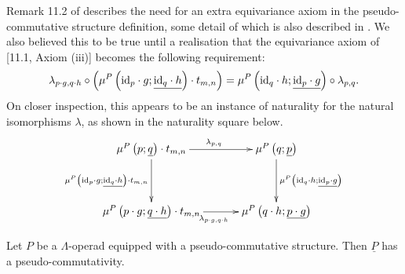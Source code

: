 \begin{remark}
Remark 11.2 of \cite{guillou_multiplicative} describes the need for an extra equivariance axiom in the pseudo-commutative structure definition, some detail of which is also described in \cite{guillou_symmetric}. We also believed this to be true until a realisation that the equivariance axiom of \cite{guillou_multiplicative}[11.1, Axiom (iii)] becomes the following requirement:
          \[
            \lambda_{p \cdot g, q \cdot h} \circ \left(\mu^P\left(\textrm{id}_p \cdot g; \underline{\textrm{id}_q \cdot h}\right) \cdot t_{m,n}\right) = \mu^P\left(\textrm{id}_q \cdot h; \underline{\textrm{id}_p \cdot g}\right) \circ \lambda_{p,q}.
          \]
On closer inspection, this appears to be an instance of naturality for the natural isomorphisms $\lambda$, as shown in the naturality square below.
          \[
            \xy
              (-20,10)*+{\mu^P\left(p;\underline{q}\right) \cdot t_{m,n}}="a";
              (20,10)*+{\mu^P\left(q;\underline{p}\right)}="b";
              (-20,-10)*+{\mu^P\left(p \cdot g; \underline{q \cdot h}\right) \cdot t_{m,n}}="c";
              (20,-10)*+{\mu^P\left(q \cdot h; \underline{p \cdot g}\right)}="d";
              {\ar^{\lambda_{p,q}} "a" ; "b"};
              {\ar^{\mu^P\left(\id_q \cdot h; \underline{\id_p \cdot g}\right)} "b" ; "d"};
              {\ar_{\mu^P\left(\id_p \cdot g; \underline{\id_q \cdot h}\right) \cdot t_{m,n}} "a" ; "c"};
              {\ar_{\lambda_{p \cdot g, q \cdot h}} "c" ; "d"};
            \endxy
          \]
\end{remark}

\begin{thm}\label{pscomm}
Let $P$ be a $\Lambda$-operad equipped with a pseudo-commutative structure. Then $\underline{P}$ has a pseudo-commutativity.
\end{thm}

